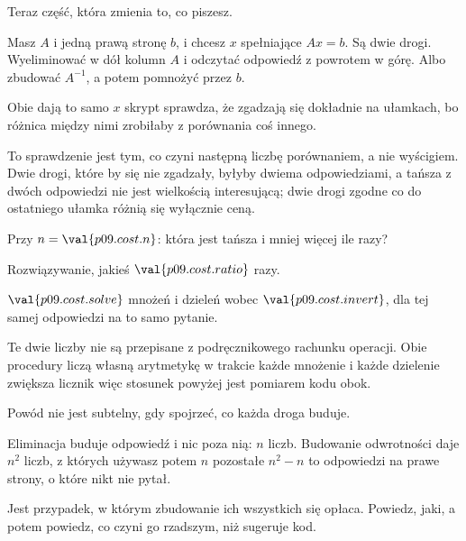 \begin{fr}
Teraz część, która zmienia to, co piszesz.

Masz $A$ i jedną prawą stronę $b$, i chcesz $x$ spełniające $Ax = b$. Są dwie
drogi. Wyeliminować w dół kolumn $A$ i odczytać odpowiedź z powrotem w górę.
Albo zbudować $A^{-1}$, a potem pomnożyć przez $b$.

Obie dają to samo $x$ \dash{} skrypt sprawdza, że zgadzają się dokładnie na
ułamkach, bo różnica między nimi zrobiłaby z porównania coś innego.

To sprawdzenie jest tym, co czyni następną liczbę porównaniem, a nie wyścigiem.
Dwie drogi, które by się nie zgadzały, byłyby dwiema odpowiedziami, a tańsza z
dwóch odpowiedzi nie jest wielkością interesującą; dwie drogi zgodne co do
ostatniego ułamka różnią się wyłącznie ceną.

Przy $n = \val{p09.cost.n}$: która jest tańsza i mniej więcej ile razy?
\dotline
\nextframe
\end{fr}

\begin{fr}
\begin{ansblock}
Rozwiązywanie, jakieś $\val{p09.cost.ratio}$ razy.
\end{ansblock}

$\val{p09.cost.solve}$ mnożeń i dzieleń wobec $\val{p09.cost.invert}$, dla tej
samej odpowiedzi na to samo pytanie.

Te dwie liczby nie są przepisane z podręcznikowego rachunku operacji. Obie
procedury liczą własną arytmetykę w trakcie \dash{} każde mnożenie i każde
dzielenie zwiększa licznik \dash{} więc stosunek powyżej jest pomiarem
kodu obok.
\end{fr}


\begin{fr}
Powód nie jest subtelny, gdy spojrzeć, co każda droga buduje.

Eliminacja buduje odpowiedź i nic poza nią: $n$ liczb. Budowanie odwrotności
daje $n^{2}$ liczb, z których używasz potem $n$ \dash{} pozostałe $n^{2} - n$
to odpowiedzi na prawe strony, o które nikt nie pytał.

Jest przypadek, w którym zbudowanie ich wszystkich się opłaca. Powiedz, jaki,
a potem powiedz, co czyni go rzadszym, niż sugeruje kod.
\dotline
\nextframe
\end{fr}

